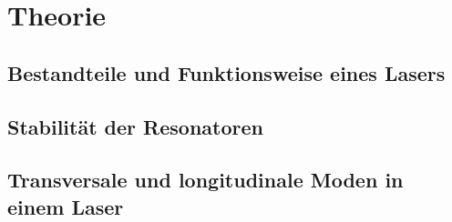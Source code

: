 \section{Theorie}
\label{sec:theorie}

\subsection{Bestandteile und Funktionsweise eines Lasers}

\subsection{Stabilität der Resonatoren}
\label{sec:stabilitaet}

\subsection{Transversale und longitudinale Moden in einem Laser}
\label{sec:moden}